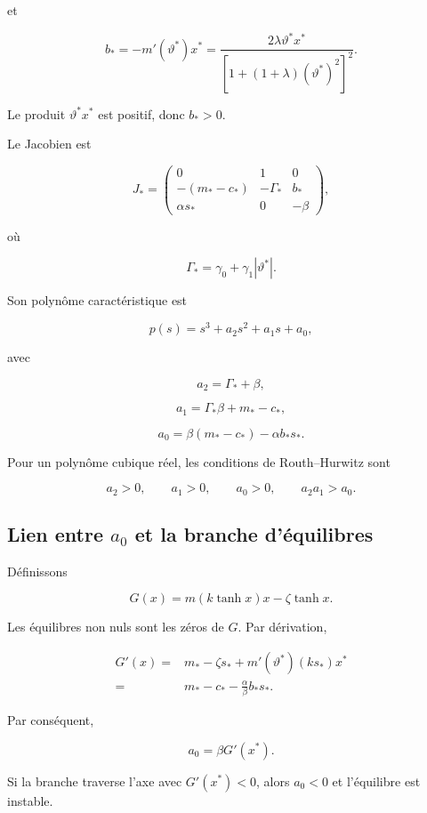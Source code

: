 et

\[
b_\ast
=
-m'(\vartheta^\ast)x^\ast
=
\frac{
2\lambda\vartheta^\ast x^\ast
}{
\left[
1+(1+\lambda)(\vartheta^\ast)^2
\right]^2
}.
\]

Le produit \(\vartheta^\ast x^\ast\) est positif, donc \(b_\ast>0\).

Le Jacobien est

\[
J_\ast
=
\begin{pmatrix}
0 & 1 & 0\\
-(m_\ast-c_\ast) & -\Gamma_\ast & b_\ast\\
\alpha s_\ast & 0 & -\beta
\end{pmatrix},
\]

où

\[
\Gamma_\ast
=
\gamma_0+\gamma_1|\vartheta^\ast|.
\]

Son polynôme caractéristique est

\[
p(s)
=
s^3+a_2s^2+a_1s+a_0,
\]

avec

\[
a_2
=
\Gamma_\ast+\beta,
\]

\[
a_1
=
\Gamma_\ast\beta
+
m_\ast-c_\ast,
\]

\[
a_0
=
\beta(m_\ast-c_\ast)
-
\alpha b_\ast s_\ast.
\]

Pour un polynôme cubique réel, les conditions de Routh--Hurwitz sont

\[
a_2>0,
\qquad
a_1>0,
\qquad
a_0>0,
\qquad
a_2a_1>a_0.
\]

\subsection{Lien entre \texorpdfstring{$a_0$}{a0} et la branche d'équilibres}

Définissons

\[
G(x)
=
m\!\left(k\tanh x\right)x
-
\zeta\tanh x.
\]

Les équilibres non nuls sont les zéros de \(G\). Par dérivation,

\[
\begin{aligned}
G'(x)
={}&
m_\ast
-
\zeta s_\ast
+
m'(\vartheta^\ast)
\left(
ks_\ast
\right)x^\ast
\\
={}&
m_\ast-c_\ast
-
\frac{\alpha}{\beta}
b_\ast s_\ast.
\end{aligned}
\]

Par conséquent,

\[
\boxed{
a_0
=
\beta G'(x^\ast).
}
\]

Si la branche traverse l'axe avec \(G'(x^\ast)<0\), alors
\(a_0<0\) et l'équilibre est instable.

